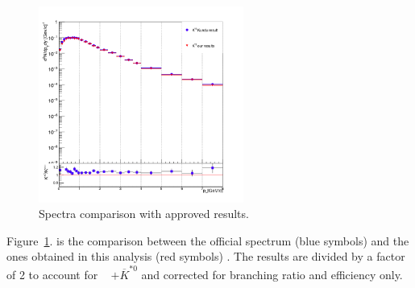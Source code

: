 \begin{figure}[H]
\begin{center}
\includegraphics[width= 0.6\textwidth]{Images/Chapter4/compkish.png}
\caption{Spectra comparison with approved results.}
\label{Fig:chap4-4.10}
\end{center}
\end{figure}


\mbox{Figure \ref{Fig:chap4-4.10}}.  is the comparison between the official \pT spectrum (blue symbols) and the ones obtained in this analysis (red symbols) . The results are divided by a factor of 2 to account for \kzero~  $+ \overline{K}^{*0}$ and corrected for branching ratio and efficiency only.
















